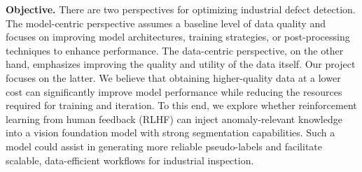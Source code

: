 \documentclass[11pt]{article}
\begin{document}
\textbf{Objective.} There are two perspectives for optimizing industrial defect detection. The model-centric perspective assumes a baseline level of data quality and focuses on improving model architectures, training strategies, or post-processing techniques to enhance performance. The data-centric perspective, on the other hand, emphasizes improving the quality and utility of the data itself. Our project focuses on the latter. We believe that obtaining higher-quality data at a lower cost can significantly improve model performance while reducing the resources required for training and iteration. To this end, we explore whether reinforcement learning from human feedback (RLHF) can inject anomaly-relevant knowledge into a vision foundation model with strong segmentation capabilities. Such a model could assist in generating more reliable pseudo-labels and facilitate scalable, data-efficient workflows for industrial inspection.
\end{document}
